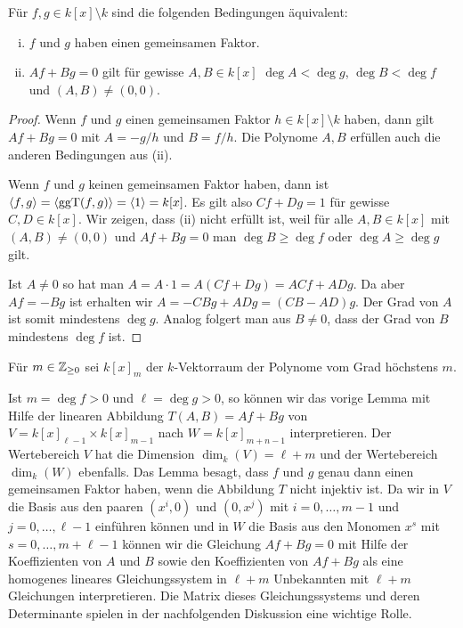 \documentclass[11pt]{article}
\numberwithin{equation}{section}
\begin{document}
\begin{lemma} 
	Für $f,g \in k[x] \setminus k$ sind die folgenden Bedingungen äquivalent: 
	\begin{enumerate}[(i)]
		\item $f$ und $g$ haben einen gemeinsamen Faktor. 
		\item $A f + B g = 0$ gilt für gewisse $A, B \in k[x]$ $\deg A < \deg g$, $\deg B < \deg f$ und $(A,B) \ne (0,0)$. 
	\end{enumerate} 
\end{lemma} 
\begin{proof}
	Wenn $f$ und $g$ einen gemeinsamen Faktor $h \in k[x] \setminus k$ haben, dann gilt $A f + B g = 0$ mit $A = - g/h$ und $B = f /h$. Die Polynome $A, B$ erfüllen auch die anderen  Bedingungen aus (ii). 
	
	Wenn $f$ und $g$ keinen gemeinsamen Faktor haben, dann ist $\left< f,g \right> = \left< \operatorname{ggT}(f,g) \right> = \left< 1 \right> = k[x]$. Es gilt also $C f + D g = 1$ für gewisse $C,D \in k[x]$. Wir zeigen, dass (ii) nicht erfüllt ist, weil für alle $A,B \in k[x]$ mit $(A,B) \ne (0,0)$ und $A f + B g = 0$ man $\deg B \ge \deg f$ oder $\deg A \ge \deg g$ gilt. 
	
	Ist $A \ne 0$ so hat man $A = A \cdot 1 = A ( C f+ D g) = A C f + A D g$. Da aber $A f = - Bg$ ist erhalten wir $A = - C B g + A D g = (CB - AD) g$. Der Grad von $A$ ist somit mindestens $\deg g$. Analog folgert man aus $B \ne 0$, dass der Grad von $B$ mindestens $\deg f$ ist. 
\end{proof} 

\begin{remark}
	Für $m \in \mathbb{Z}_{\ge 0}$ sei $k[x]_m$ der $k$-Vektorraum der Polynome vom Grad höchstens $m$. 

	Ist $m = \deg f > 0$ und $\ell = \deg g > 0$, so können wir das vorige Lemma mit Hilfe der linearen Abbildung  $T(A,B) = A f + B g$  von $V= k[x]_{\ell -1} \times k[x]_{m-1}$ nach $W= k[x]_{m+n -1}$ interpretieren. Der Wertebereich $V$ hat die Dimension $\dim_k (V) = \ell + m$ und der Wertebereich $\dim_k (W)$ ebenfalls. Das Lemma besagt, dass $f$ und $g$ genau dann einen gemeinsamen Faktor haben, wenn die Abbildung $T$ nicht injektiv ist. Da wir in $V$ die Basis aus  den paaren $(x^i,0)$ und $(0,x^j)$ mit $i=0,\ldots,m-1$ und $j = 0,\ldots, \ell-1$ einführen können und in $W$ die Basis aus den Monomen $x^s$ mit $s = 0,\ldots, m+ \ell - 1$ können wir die Gleichung $A f + B g =0$ mit Hilfe der Koeffizienten von $A$ und $B$ sowie den Koeffizienten von $A f + Bg$ als eine homogenes lineares Gleichungssystem in $\ell+m$ Unbekannten mit $\ell+m$ Gleichungen interpretieren. Die Matrix dieses Gleichungssystems und deren Determinante spielen in der nachfolgenden Diskussion eine wichtige Rolle. 
\end{remark} 
\end{document}
